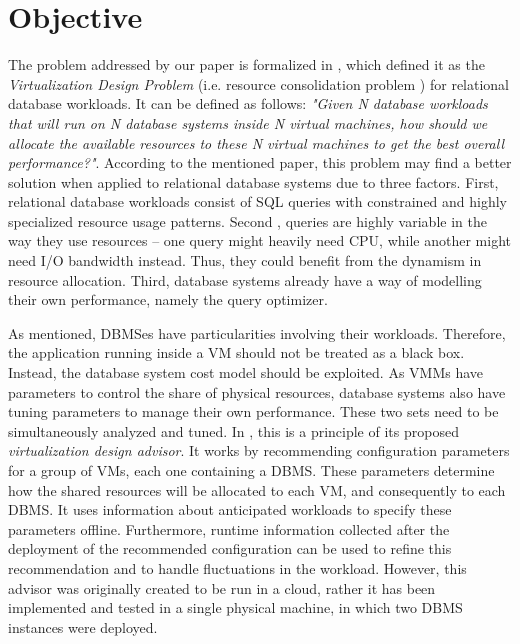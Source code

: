 \section{Objective}

The problem addressed by our paper is formalized in \cite{4401021}, which defined it as the \textit{Virtualization Design Problem} (i.e. resource consolidation problem ) for relational database workloads. It can be defined as follows: \textit{"Given N database workloads that will run on N database systems inside N virtual 
machines, how should we allocate the available resources to these N virtual machines to get the best overall performance?"}. According to the mentioned paper, this problem may find a better solution when applied to relational database systems due to three factors. First, relational database workloads consist of SQL queries with constrained and highly specialized resource usage patterns. Second , queries are highly variable in the way they use resources -- one query might heavily need CPU, while another might need I/O bandwidth instead. Thus, they could benefit from the dynamism in resource allocation. Third, database systems already have a way of modelling their own performance, namely the query optimizer.

As mentioned, DBMSes have particularities involving their workloads. Therefore, the application running inside a VM should not be treated as a black box. Instead, the database system cost model should be exploited. As VMMs have parameters to control the share of physical resources, database systems also have tuning parameters to manage their own performance. These two sets need to be simultaneously analyzed and tuned. In \cite{Soror:2008:AVM:1376616.1376711}, this is a principle of its proposed \textit{virtualization design advisor}. It works by recommending configuration parameters for a group of VMs, each one containing a DBMS. These parameters determine how the shared resources will be allocated to each VM, and consequently to each DBMS. It uses information about anticipated workloads to specify these parameters offline. Furthermore, runtime information collected after the deployment of the recommended configuration can be used to refine this recommendation and to handle fluctuations in the workload. However, this advisor was originally created to be run in a cloud, rather it has been implemented and tested in a single physical machine, in which two DBMS instances were deployed.

